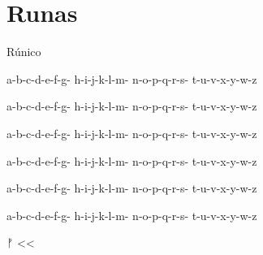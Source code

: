 
\newcommand{\SIG}[1]{{\par\nobreak
      \smallskip\hfill\footnotesize#1\par\medskip
  }}

\parskip0pt

\chapter{Runas}

Rúnico

a-b-c-d-e-f-g-
h-i-j-k-l-m-
n-o-p-q-r-s-
t-u-v-x-y-w-z

a-b-c-d-e-f-g-
h-i-j-k-l-m-
n-o-p-q-r-s-
t-u-v-x-y-w-z

a-b-c-d-e-f-g-
h-i-j-k-l-m-
n-o-p-q-r-s-
t-u-v-x-y-w-z

a-b-c-d-e-f-g-
h-i-j-k-l-m-
n-o-p-q-r-s-
t-u-v-x-y-w-z

a-b-c-d-e-f-g-
h-i-j-k-l-m-
n-o-p-q-r-s-
t-u-v-x-y-w-z

a-b-c-d-e-f-g-
h-i-j-k-l-m-
n-o-p-q-r-s-
t-u-v-x-y-w-z


ᚠ << 

%
%


%
